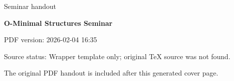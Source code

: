 \documentclass[11pt,a4paper]{article}
\newcommand{\seminartitle}{O-Minimal Structures Seminar}
\newcommand{\seminarsubtitle}{Seminar handout}
\newcommand{\seminardate}{2026-02-04 16:35}
\newcommand{\seminarsourcestatus}{Wrapper template only; original TeX source was not found.}
\begin{document}
\begin{titlepage}
\thispagestyle{empty}
\vspace*{0.16\textheight}
{\Large\color{seminarblue}\seminarsubtitle\par}
\vspace{1.5em}
{\LARGE\bfseries \seminartitle\par}
\vspace{2em}
{\large PDF version: \seminardate\par}
\vfill
{\small Source status: \seminarsourcestatus\par}
\vspace{1em}
{\small The original PDF handout is included after this generated cover page.\par}
\end{titlepage}

\clearpage
\hypersetup{pageanchor=false}

\end{document}
